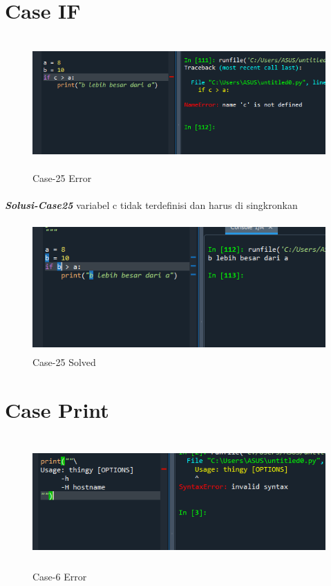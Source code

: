 \documentclass[12pt,a4paper]{article}
\begin{document}
\newpage
\section{Case IF}
\begin{figure}[ht]
    \centerline{\includegraphics[width=15cm,height=5cm]{image/case25.png}}
    \renewcommand{\figurename}{Gambar}
    \caption{Case-25 Error}
\end{figure}
\paragraph{}\textbf{\textit{Solusi-Case25}} {variabel c tidak terdefinisi dan harus di singkronkan}
\begin{figure}[ht]
    \centerline{\includegraphics[width=15cm,height=5cm]{image/case25-solved.png}}
    \renewcommand{\figurename}{Gambar}
    \caption{Case-25 Solved}
\end{figure}

\newpage
\section{Case Print}
\begin{figure}[ht]
    \centerline{\includegraphics[width=15cm,height=5cm]{image/case6.png}}
    \renewcommand{\figurename}{Gambar}
    \caption{Case-6 Error}
\end{figure}
\end{document}

